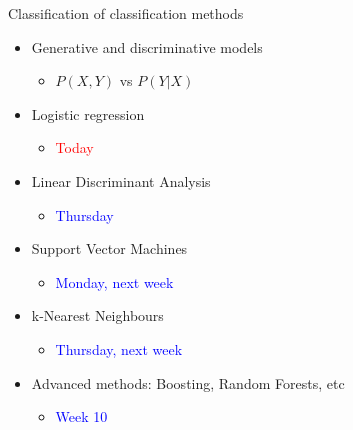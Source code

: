 \documentclass[14pt]{beamer}
\begin{document}
\begin{frame}{\normalsize Classification of classification methods}\large


\begin{itemize}
	\item \alert{Generative} and \alert{discriminative}  models
	\begin{itemize}
	\item $P(X, Y)$ vs $P(Y|X)$
	\end{itemize}

	\item Logistic regression
	\begin{itemize}
	\item \textcolor{red}{Today}
	\end{itemize}

	\item Linear Discriminant Analysis
	\begin{itemize}
	\item \textcolor{blue}{Thursday}
	\end{itemize}
	
	\item Support Vector Machines
	\begin{itemize}
	\item \textcolor{blue}{Monday, next week}
	\end{itemize}
	
	\item k-Nearest Neighbours
	\begin{itemize}
	\item \textcolor{blue}{Thursday, next week}
	\end{itemize}
	
	\item Advanced methods: Boosting, Random Forests, etc
	\begin{itemize}
	\item \textcolor{blue}{Week 10}
	\end{itemize}
\end{itemize}

\end{frame}
\end{document}
